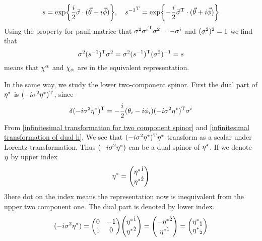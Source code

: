 \begin{equation} \label{finite transformation for upper two component spinor}
s =
\exp{\frac{i}{2}\vec{\sigma}\cdot(\vec{\theta}+i\vec{\phi})},
\quad
{s^{-1}}^{\text{T}} = \exp{-\frac{i}{2}\vec{\sigma}^{\text{T}}\cdot(\vec{\theta}+i\vec{\phi})}
\end{equation}
Using the property for pauli matrice that $\sigma^2{\sigma^{i}}^{\text{T}}\sigma^2 =- \sigma^i$ and $(\sigma^2)^2 =1$ we find that
\begin{equation} \label{equivalence of upper spinor with its dual space}
\sigma^2(s^{-1})^{\text{T}}\sigma^2 =\sigma^2(s^{-1})^{\text{T}}(\sigma^2)^{-1} =s
\end{equation}
means that $\chi^\alpha$ and $\chi_\alpha$ are in the equivalent representation.

In the same way, we study the lower two-component spinor. First the dual part of ${\eta^*}$ is $(-i\sigma^{2}{\eta^*})^{\text{T}}$, since
\begin{equation} \label{infinitesimal transformation of dual h}
\delta(-i\sigma^{2}{\eta^*})^{\text{T}}
= -\frac{i}{2}(\theta_i-i\phi_i)(-i\sigma^2{\eta^*})^{\text{T}}\sigma^{i}
\end{equation}
From \eqref{infinitesimal transformation for two component spinor} and \eqref{infinitesimal transformation of dual h}, We see that
$(-i\sigma^{2}{\eta^*})^{\text{T}}{\eta^*}$ transform as a scalar under Lorentz transformation. Thus $(-i\sigma^{2}{\eta^*})$ can be a dual spinor of ${\eta^*}$. If we denote $\eta$ by upper index
\begin{equation}
  \lh = \mqty({\lh}^{\dot{1}} \\ {\lh}^{\dot{2}})
\end{equation}
3here dot on the index means the representation now is inequivalent from the upper two component one. The dual part is denoted by lower index.
\begin{equation}
  (-i\s^2\lh) = \mqty(0 & -1 \\ 1 & 0)
           \mqty(\lh^{\dot{1}}\\ \lh^{\dot{2}})
         = \mqty(-\lh^{\dot{2}}\\ \lh^{\dot{1}})
         = \mqty(\lh_{\dot{1}} \\ \lh_{\dot{2}})
\end{equation}

